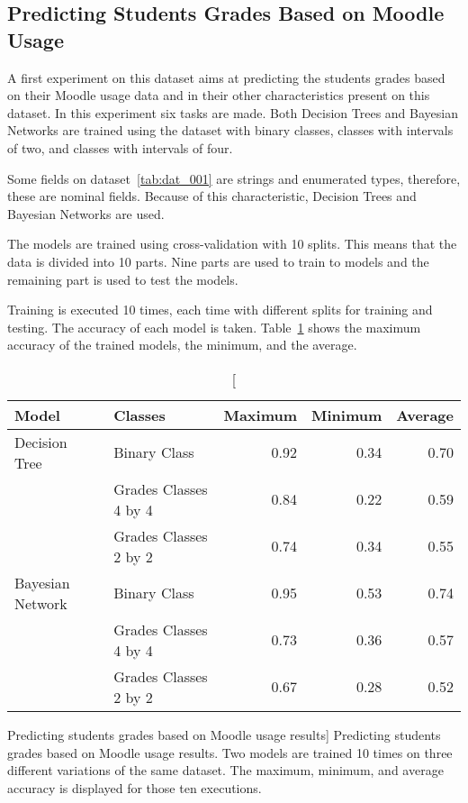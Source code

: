 \subsection{Predicting Students Grades Based on Moodle Usage}

A first experiment on this dataset aims at predicting the students grades based
on their Moodle usage data and in their other characteristics present on this
dataset. In this experiment six tasks are made. Both Decision Trees and Bayesian
Networks are trained using the dataset with binary classes, classes with
intervals of two, and classes with intervals of four.

Some fields on dataset~\ref{tab:dat_001} are strings and enumerated types,
therefore, these are nominal fields. Because of this characteristic, Decision
Trees and Bayesian Networks are used.~

The models are trained using cross-validation with 10 splits. This means that
the data is divided into 10 parts. Nine parts are used to train to models and
the remaining part is used to test the models.

Training is executed 10 times, each time with different splits for training and
testing. The accuracy of each model is taken. Table~\ref{tab:exp_001_res} shows
the maximum accuracy of the trained models, the minimum, and the average.

\begin{table}[h!]
    \centering

    \begin{tabular}{| l | l | r | r | r |}
        \hline
        \textbf{Model} & \textbf{Classes} & \textbf{Maximum} & \textbf{Minimum} & \textbf{Average} \\ \hline
        Decision Tree    & Binary Class          & 0.92 & 0.34 & 0.70 \\
                         & Grades Classes 4 by 4 & 0.84 & 0.22 & 0.59 \\
                         & Grades Classes 2 by 2 & 0.74 & 0.34 & 0.55 \\ \hline
        Bayesian Network & Binary Class          & 0.95 & 0.53 & 0.74 \\
                         & Grades Classes 4 by 4 & 0.73 & 0.36 & 0.57 \\
                         & Grades Classes 2 by 2 & 0.67 & 0.28 & 0.52 \\ \hline
    \end{tabular}

    \caption
        [Predicting students grades based on Moodle usage results]
        {Predicting students grades based on Moodle usage results. Two models
        are trained 10 times on three different variations of the same dataset.
        The maximum, minimum, and average accuracy is displayed for those ten
        executions.}

    \label{tab:exp_001_res}
\end{table}

